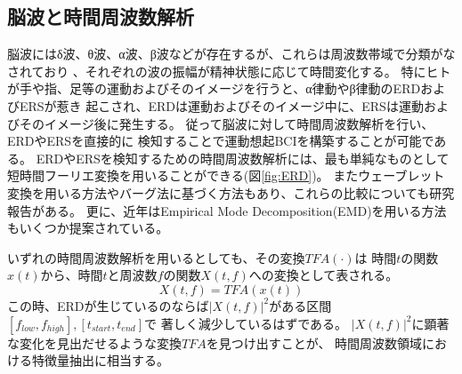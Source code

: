 \subsection{脳波と時間周波数解析}
脳波にはδ波、θ波、α波、β波などが存在するが、これらは周波数帯域で分類がなされており
、それぞれの波の振幅が精神状態に応じて時間変化する。
特にヒトが手や指、足等の運動およびそのイメージを行うと、α律動やβ律動のERDおよびERSが惹き
起こされ、ERDは運動およびそのイメージ中に、ERSは運動およびそのイメージ後に発生する\cite{ERDとERS}。
従って脳波に対して時間周波数解析を行い、ERDやERSを直接的に
検知することで運動想起BCIを構築することが可能である\cite{Beta波によるBCI}。
ERDやERSを検知するための時間周波数解析には、最も単純なものとして短時間フーリエ変換を用いることができる(図\ref{fig:ERD})。
またウェーブレット変換を用いる方法やバーグ法に基づく方法もあり、これらの比較についても研究報告がある\cite{時間周波数解析の比較}。
更に、近年はEmpirical Mode Decomposition(EMD)を用いる方法もいくつか提案されている\cite{EMD,IMF}。

いずれの時間周波数解析を用いるとしても、その変換\(TFA(\cdot)\)は
時間\(t\)の関数\(x(t)\)から、時間\(t\)と周波数\(f\)の関数\(X(t,f)\)への変換として表される。
\begin{equation}
    X(t,f) = TFA(x(t))
    \label{eq:time-freq}
\end{equation}
この時、ERDが生じているのならば\(|X(t,f)|^2\)がある区間\([f_{low}, f_{high}],[t_{start}, t_{end}]\)で
著しく減少しているはずである。
\(|X(t,f)|^2\)に顕著な変化を見出だせるような変換\(TFA\)を見つけ出すことが、
時間周波数領域における特徴量抽出に相当する。


